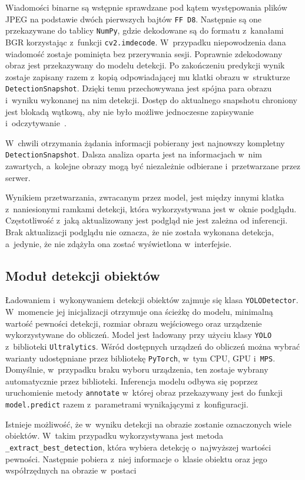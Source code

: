 Wiadomości binarne są wstępnie sprawdzane pod kątem występowania plików JPEG na podstawie dwóch pierwszych bajtów \texttt{FF D8}. Następnie są one przekazywane do tablicy \texttt{NumPy}, gdzie dekodowane są do formatu z~kanałami BGR korzystając z~funkcji \texttt{cv2.imdecode}. W~przypadku niepowodzenia dana wiadomość zostaje pominięta bez przerywania sesji. Poprawnie zdekodowany obraz jest przekazywany do modelu detekcji. Po zakończeniu predykcji wynik zostaje zapisany razem z~kopią odpowiadającej mu klatki obrazu w~strukturze \texttt{DetectionSnapshot}. Dzięki temu przechowywana jest spójna para obrazu i~wyniku wykonanej na nim detekcji. Dostęp do aktualnego snapshotu chroniony jest blokadą wątkową, aby nie było możliwe jednoczesne zapisywanie i~odczytywanie~.

W~chwili otrzymania żądania informacji pobierany jest najnowszy kompletny \texttt{DetectionSnapshot}. Dalsza analiza oparta jest na informacjach w~nim zawartych, a~kolejne obrazy mogą być niezależnie odbierane i~przetwarzane przez serwer.

Wynikiem przetwarzania, zwracanym przez model, jest między innymi klatka z~naniesionymi ramkami detekcji, która wykorzystywana jest w~oknie podglądu. Częstotliwość z~jaką aktualizowany jest podgląd nie jest zależna od inferencji. Brak aktualizacji podglądu nie oznacza, że nie została wykonana detekcja, a~jedynie, że nie zdążyła ona zostać wyświetlona w~interfejsie.

\subsection{Moduł detekcji obiektów}

Ładowaniem i~wykonywaniem detekcji obiektów zajmuje się klasa \texttt{YOLODetector}. W~momencie jej inicjalizacji otrzymuje ona ścieżkę do modelu, minimalną wartość pewności detekcji, rozmiar obrazu wejściowego oraz urządzenie wykorzystywane do obliczeń. Model jest ładowany przy użyciu klasy \texttt{YOLO} z~biblioteki \texttt{Ultralytics}. Wśród dostępnych urządzeń do obliczeń można wybrać warianty udostępniane przez bibliotekę \texttt{PyTorch}, w~tym CPU, GPU i~\texttt{MPS}. Domyślnie, w~przypadku braku wyboru urządzenia, ten zostaje wybrany automatycznie przez biblioteki. Inferencja modelu odbywa się poprzez uruchomienie metody \texttt{annotate} w~której obraz przekazywany jest do funkcji \texttt{model.predict} razem z~parametrami wynikającymi z~konfiguracji.

Istnieje możliwość, że w~wyniku detekcji na obrazie zostanie oznaczonych wiele obiektów. W~takim przypadku wykorzystywana jest metoda \texttt{\_extract\_best\_detection}, która wybiera detekcję o~najwyższej wartości pewności. Następnie pobiera z~niej informacje o~klasie obiektu oraz jego współrzędnych na obrazie w~postaci

